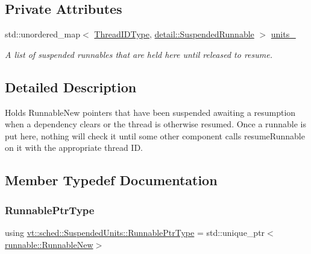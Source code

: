 \subsection*{Private Attributes}
\begin{DoxyCompactItemize}
\item 
std\+::unordered\+\_\+map$<$ \hyperlink{namespacevt_a9b887d814dd25ff495a0c8270304ac02}{Thread\+I\+D\+Type}, \hyperlink{structvt_1_1sched_1_1detail_1_1_suspended_runnable}{detail\+::\+Suspended\+Runnable} $>$ \hyperlink{structvt_1_1sched_1_1_suspended_units_a21eb59ab4bd3b27bbb5f2913a15b0d49}{units\+\_\+}
\begin{DoxyCompactList}\small\item\em A list of suspended runnables that are held here until released to resume. \end{DoxyCompactList}\end{DoxyCompactItemize}


\subsection{Detailed Description}
Holds {\ttfamily Runnable\+New} pointers that have been suspended awaiting a resumption when a dependency clears or the thread is otherwise resumed. Once a runnable is put here, nothing will check it until some other component calls {\ttfamily resume\+Runnable} on it with the appropriate thread ID. 

\subsection{Member Typedef Documentation}
\mbox{\label{structvt_1_1sched_1_1_suspended_units_a48612d5997d8d3869ca8f2e1d061fd5f}} 
\subsubsection{\texorpdfstring{Runnable\+Ptr\+Type}{RunnablePtrType}}
{\footnotesize\ttfamily using \hyperlink{structvt_1_1sched_1_1_suspended_units_a48612d5997d8d3869ca8f2e1d061fd5f}{vt\+::sched\+::\+Suspended\+Units\+::\+Runnable\+Ptr\+Type} =  std\+::unique\+\_\+ptr$<$\hyperlink{structvt_1_1runnable_1_1_runnable_new}{runnable\+::\+Runnable\+New}$>$}



